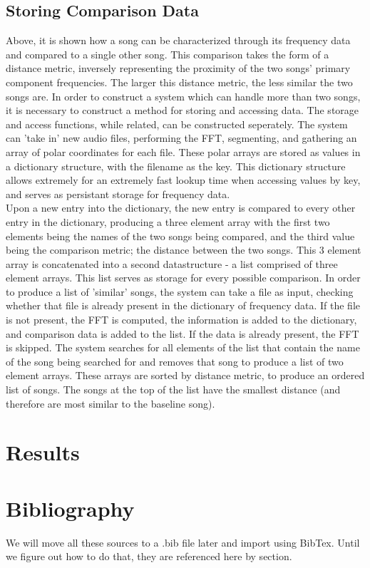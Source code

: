 \documentclass[conference]{IEEEtran}
\begin{document}
\subsection{Storing Comparison Data}
Above, it is shown how a song can be characterized through its frequency data and compared to a single other song. This comparison takes the form of a distance metric, inversely representing the proximity of the two songs' primary component frequencies. The larger this distance metric, the less similar the two songs are. In order to construct a system which can handle more than two songs, it is necessary to construct a method for storing and accessing data. The storage and access functions, while related, can be constructed seperately. The system can 'take in' new audio files, performing the FFT, segmenting, and gathering an array of polar coordinates for each file. These polar arrays are stored as values in a dictionary structure, with the filename as the key. This dictionary structure allows extremely for an extremely fast lookup time when accessing values by key, and serves as persistant storage for frequency data.\\
Upon a new entry into the dictionary, the new entry is compared to every other entry in the dictionary, producing a three element array with the first two elements being the names of the two songs being compared, and the third value being the comparison metric; the distance between the two songs. This 3 element array is concatenated into a second datastructure - a list comprised of three element arrays. This list serves as storage for every possible comparison. In order to produce a list of 'similar' songs, the system can take a file as input, checking whether that file is already present in the dictionary of frequency data. If the file is not present, the FFT is computed, the information is added to the dictionary, and comparison data is added to the list. If the data is already present, the FFT is skipped. The system searches for all elements of the list that contain the name of the song being searched for and removes that song to produce a list of two element arrays. These arrays are sorted by distance metric, to produce an ordered list of songs. The songs at the top of the list have the smallest distance (and therefore are most similar to the baseline song). 
\section{Results}

\section{Bibliography}
We will move all these sources to a .bib file later and import using BibTex.
Until we figure out how to do that, they are referenced here by section.
\end{document}
